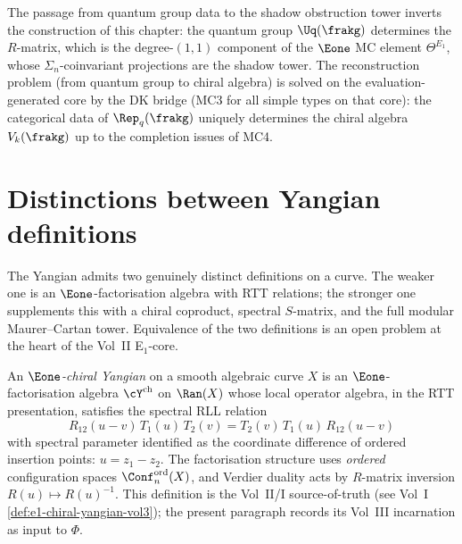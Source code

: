 \begin{remark}
\label{rem:qg-to-shadow}
The passage from quantum group data to the shadow obstruction tower
inverts the construction of this chapter: the quantum group
$\Uq(\frakg)$ determines the $R$-matrix, which is the degree-$(1,1)$
component of the $\Eone$ MC element $\Theta^{E_1}$, whose
$\Sigma_n$-coinvariant projections are the shadow tower. The
reconstruction problem (from quantum group to chiral algebra) is
solved on the evaluation-generated core by the DK bridge (MC3 for all
simple types on that core): the categorical
data of $\Rep_q(\frakg)$ uniquely determines the chiral algebra
$V_k(\frakg)$ up to the completion issues of MC4.
\end{remark}


\section{Distinctions between Yangian definitions}
\label{sec:two-yangian-definitions}

The Yangian admits two genuinely distinct definitions on a curve.
The weaker one is an $\Eone$-factorisation algebra with RTT
relations; the stronger one supplements this with a chiral
coproduct, spectral $S$-matrix, and the full modular Maurer--Cartan
tower. Equivalence of the two definitions is an open problem at
the heart of the Vol~II E$_1$-core.

\begin{definition}
\label{def:e1-chiral-yangian-vol3}
An \emph{$\Eone$-chiral Yangian} on a smooth algebraic curve $X$ is
an $\Eone$-factorisation algebra $\cY^{\mathrm{ch}}$ on $\Ran(X)$
whose local operator algebra, in the RTT presentation, satisfies
the spectral RLL relation
\[
 R_{12}(u-v)\, T_1(u)\, T_2(v)
 = T_2(v)\, T_1(u)\, R_{12}(u-v)
\]
with spectral parameter identified as the coordinate difference
of ordered insertion points: $u = z_1 - z_2$. The factorisation
structure uses \emph{ordered} configuration spaces
$\Conf^{\mathrm{ord}}_n(X)$, and Verdier duality acts by
$R$-matrix inversion $R(u) \mapsto R(u)^{-1}$. This definition is
the Vol~II/I source-of-truth (see Vol~I
\cite{VolI} \ref{def:e1-chiral-yangian-vol3});
the present paragraph records its Vol~III incarnation as input
to $\Phi$.
\end{definition}

